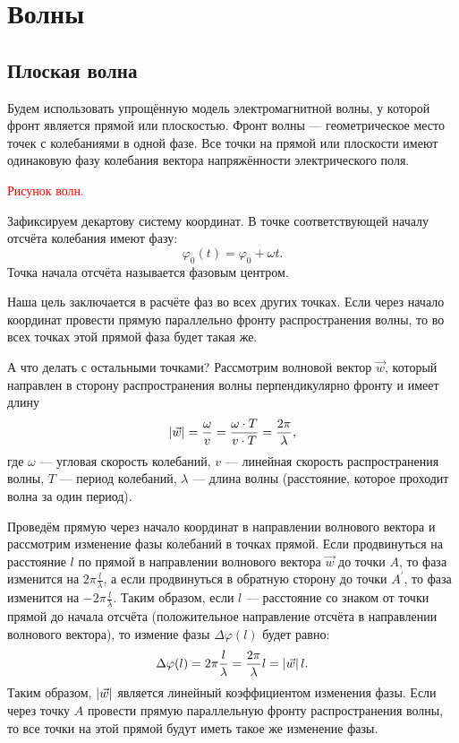\chapter{Волны}


\section{Плоская волна}

Будем использовать упрощённую модель электромагнитной волны, у которой фронт является прямой или плоскостью. Фронт волны --- геометрическое место точек с колебаниями в одной фазе.
Все точки на прямой или плоскости имеют одинаковую фазу колебания вектора напряжённости электрического поля.

\textcolor{red}{Рисунок волн.}

Зафиксируем декартову систему координат. В точке соответствующей началу отсчёта колебания имеют фазу:
\[
    \varphi_0(t) = \varphi_0 + \omega t.
\]
Точка начала отсчёта называется фазовым центром.

Наша цель заключается в расчёте фаз во всех других точках. Если через начало координат провести прямую параллельно фронту распространения волны, то во всех точках
этой прямой фаза будет такая же.

А что делать с остальными точками? Рассмотрим волновой вектор $\vec{w}$, который направлен в сторону распространения волны перпендикулярно фронту и имеет длину
\[
    \left | \vec{w} \right |
    = \frac{\omega}{v}
    = \frac{\omega \cdot T}{v \cdot T}
    = \frac{2 \pi}{\lambda} ,
\]
где $\omega$ --- угловая скорость колебаний, $v$ --- линейная скорость распространения волны, $T$ --- период колебаний, $\lambda$ --- длина волны (расстояние,
которое проходит волна за один период).

Проведём прямую через начало координат в направлении волнового вектора и рассмотрим изменение фазы колебаний в точках прямой. Если продвинуться на расстояние
$l$ по прямой в направлении волнового вектора $\vec{w}$ до точки $A$, то фаза изменится на $2 \pi \frac{l}{\lambda}$, а если продвинуться в обратную сторону
до точки $A^\prime$, то фаза изменится на $- 2 \pi \frac{l}{\lambda}$. Таким образом, если $l$ --- расстояние со знаком от точки прямой до начала отсчёта
(положительное направление отсчёта в направлении волнового вектора), то измение фазы $\Delta \varphi(l)$ будет равно:
\[
    \Delta \varphi(l)
    = 2 \pi \frac{l}{\lambda}
    = \frac{2 \pi} {\lambda} l
    = \left | \vec{w} \right | l .
\]
Таким образом, $\left | \vec{w} \right |$ является линейный коэффициентом изменения фазы. Если через точку $A$ провести прямую параллельную фронту распространения волны,
то все точки на этой прямой будут иметь такое же изменение фазы.

